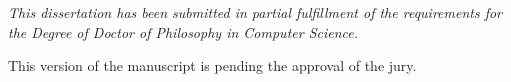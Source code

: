 
\vspace*{\fill}
\begin{center}
{\it This dissertation has been submitted in partial fulfillment of
the requirements for the Degree of Doctor of Philosophy in
Computer Science.

\vskip1cm

This version of the manuscript is pending the approval
of the jury.}
\end{center}
\vspace*{\fill}
\vspace*{\fill}
\vspace*{\fill}
